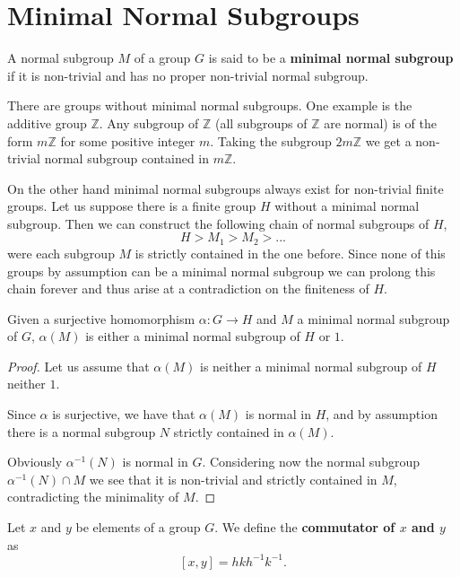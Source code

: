 \section{Minimal Normal Subgroups}

\begin{definition}
A normal subgroup $M$ of a group $G$ is said to be a \textbf{minimal normal subgroup} if it is non-trivial and has no proper non-trivial normal subgroup.
\end{definition}

There are groups without minimal normal subgroups. One example is the additive group $\mathbb{Z}$. Any subgroup of $\mathbb{Z}$ (all subgroups of $\mathbb{Z}$ are normal) is of the form $m\mathbb{Z}$ for some positive integer $m$. Taking the subgroup $2m\mathbb{Z}$ we get a non-trivial normal subgroup contained in $m\mathbb{Z}$.

On the other hand minimal normal subgroups always exist for non-trivial finite groups. Let us suppose there is a finite group $H$ without a minimal normal subgroup. Then we can construct the following chain of normal subgroups of $H$,
$$
H > M_1 > M_2 > ...
$$
were each subgroup $M$ is strictly contained in the one before. Since none of this groups by assumption can be a minimal normal subgroup we can prolong this chain forever and thus arise at a contradiction on the finiteness of $H$.

\begin{theorem}
    \label{hommnsub}
    Given a surjective homomorphism $\alpha\colon G \rightarrow H$ and $M$ a minimal normal subgroup of $G$, $\alpha(M)$ is either a minimal normal subgroup of $H$ or $1$.
\end{theorem}
\begin{proof}
    Let us assume that $\alpha(M)$ is neither a minimal normal subgroup of $H$ neither $1$.

    Since $\alpha$ is surjective, we have that $\alpha(M)$ is normal in $H$, and by assumption there is a normal subgroup $N$ strictly contained in $\alpha(M)$.
    
    Obviously $\alpha^{-1}(N)$ is normal in $G$. Considering now the normal subgroup $\alpha^{-1}(N) \cap M$ we see that it is non-trivial and strictly contained in $M$, contradicting the minimality of $M$.
\end{proof}

\begin{definition}
    Let $x$ and $y$ be elements of a group $G$. We define the \textbf{commutator of $x$ and $y$} as 
    $$
    [x,y] = hkh^{-1}k^{-1}.
    $$
\end{definition}

